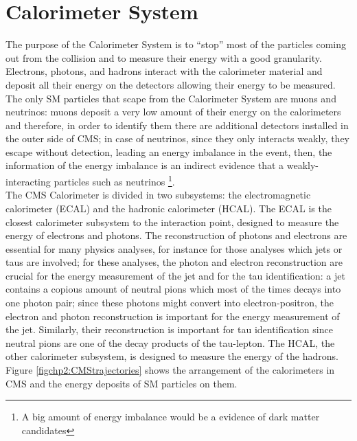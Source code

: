 \section{Calorimeter System}

The purpose of the Calorimeter System is to ``stop'' most of the particles 
coming out from the collision and to measure their energy with a good 
granularity. Electrons, photons, and hadrons interact with the calorimeter 
material and deposit all their energy on the detectors allowing their energy 
to be measured. The only SM particles that scape from the Calorimeter System are 
muons and neutrinos: muons deposit a very low amount of their energy on the 
calorimeters and therefore, in order to identify them there are additional 
detectors installed in the outer side of CMS; in case of neutrinos, since they 
only interacts weakly, they escape without detection, leading an energy 
imbalance in the event, then, the information of the energy imbalance 
is an indirect evidence that a weakly-interacting particles such 
as neutrinos \footnote{A big amount of energy 
imbalance would be a evidence of dark matter candidates}. \\

The CMS Calorimeter is divided in two subsystems: the electromagnetic calorimeter (ECAL) and 
the hadronic calorimeter (HCAL). The ECAL is the closest calorimeter subsystem to the interaction point, 
designed to measure the energy of electrons and photons. The reconstruction of photons and 
electrons are essential for many physics analyses, for instance for those analyses which 
jets or taus are involved; for these analyses, the photon and electron 
reconstruction are crucial for the energy measurement of the jet and for 
the tau identification: a jet contains a copious amount of 
neutral pions which most of the times decays into one photon pair; since
these photons might convert into electron-positron, the electron and 
photon reconstruction is important for the energy measurement of the jet. Similarly, their
reconstruction is important for tau identification since neutral pions are one of the decay 
products of the tau-lepton. The HCAL, the other calorimeter subsystem, is designed to measure the energy of the 
hadrons. Figure \ref{figchp2:CMStrajectories} shows the arrangement of the 
calorimeters in CMS and the energy deposits of SM particles on them.








